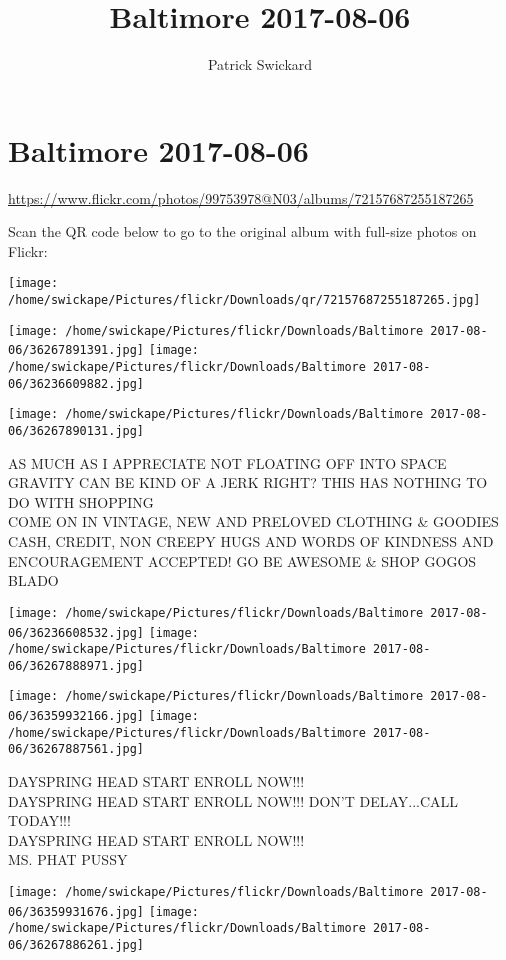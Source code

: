 \documentclass[10pt,letterpaper]{article}
\title{Baltimore 2017-08-06}
\author{Patrick Swickard}
\date{}
\begin{document}
\section*{Baltimore 2017-08-06}

\url{https://www.flickr.com/photos/99753978@N03/albums/72157687255187265}

Scan the QR code below to go to the original album with full-size photos on Flickr:

\texttt{[image: /home/swickape/Pictures/flickr/Downloads/qr/72157687255187265.jpg]}
\pagebreak

\texttt{[image: /home/swickape/Pictures/flickr/Downloads/Baltimore 2017-08-06/36267891391.jpg]}
\texttt{[image: /home/swickape/Pictures/flickr/Downloads/Baltimore 2017-08-06/36236609882.jpg]}

\vspace{0.25in}
\texttt{[image: /home/swickape/Pictures/flickr/Downloads/Baltimore 2017-08-06/36267890131.jpg]}

AS MUCH AS I APPRECIATE NOT FLOATING OFF INTO SPACE GRAVITY CAN BE KIND OF A JERK RIGHT?  THIS HAS NOTHING TO DO WITH SHOPPING\\
COME ON IN VINTAGE, NEW AND PRELOVED CLOTHING \& GOODIES CASH, CREDIT, NON CREEPY HUGS AND WORDS OF KINDNESS AND ENCOURAGEMENT ACCEPTED!  GO BE AWESOME \& SHOP GOGOS\\
BLADO
\pagebreak

\texttt{[image: /home/swickape/Pictures/flickr/Downloads/Baltimore 2017-08-06/36236608532.jpg]}
\texttt{[image: /home/swickape/Pictures/flickr/Downloads/Baltimore 2017-08-06/36267888971.jpg]}

\texttt{[image: /home/swickape/Pictures/flickr/Downloads/Baltimore 2017-08-06/36359932166.jpg]}
\texttt{[image: /home/swickape/Pictures/flickr/Downloads/Baltimore 2017-08-06/36267887561.jpg]}

DAYSPRING HEAD START ENROLL NOW!!!\\
DAYSPRING HEAD START ENROLL NOW!!!  DON'T DELAY...CALL TODAY!!!\\
DAYSPRING HEAD START ENROLL NOW!!!\\
MS. PHAT PUSSY
\pagebreak

\texttt{[image: /home/swickape/Pictures/flickr/Downloads/Baltimore 2017-08-06/36359931676.jpg]}
\texttt{[image: /home/swickape/Pictures/flickr/Downloads/Baltimore 2017-08-06/36267886261.jpg]}
\end{document}
